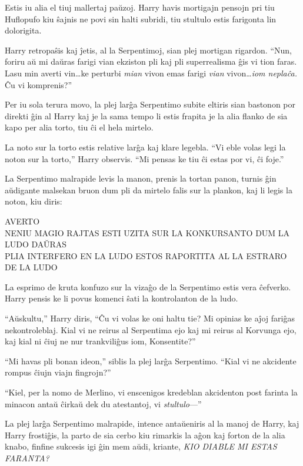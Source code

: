 Estis iu alia el tiuj mallertaj paŭzoj. Harry havis mortigajn pensojn pri tiu
Huflopufo kiu ŝajnis ne povi sin halti subridi, tiu stultulo estis farigonta lin
dolorigita.

Harry retropaŝis kaj ĵetis, al la Serpentimoj, sian plej mortigan rigardon. ``Nun,
foriru aŭ mi daŭras farigi vian ekziston pli kaj pli superrealisma ĝis vi tion
faras. Lasu min averti vin\ldots ke perturbi \emph{mian} vivon emas farigi
\emph{vian} vivon\ldots \emph{iom neplaĉa.} Ĉu vi komprenis?''

Per iu sola terura movo, la plej larĝa Serpentimo subite eltiris sian bastonon
por direkti ĝin al Harry kaj je la sama tempo li estis frapita je la alia flanko
de sia kapo per alia torto, tiu ĉi el hela mirtelo.

La noto sur la torto estis relative larĝa kaj klare legebla. ``Vi eble
volas legi la noton sur la torto,'' Harry observis. ``Mi pensas ke
tiu ĉi estas por vi, ĉi foje.'' 

La Serpentimo malrapide levis la manon, prenis la tortan panon, turnis ĝin
aŭdigante malsekan bruon dum pli da mirtelo falis sur la plankon, kaj li legis
la noton, kiu diris:

\begin{center}
  AVERTO\\

  NENIU MAGIO RAJTAS ESTI UZITA SUR LA KONKURSANTO DUM LA LUDO DAŬRAS\\
  PLIA INTERFERO EN LA LUDO ESTOS RAPORTITA AL LA ESTRARO DE LA LUDO
\end{center}

La esprimo de kruta konfuzo sur la vizaĝo de la Serpentimo estis vera
ĉefverko. Harry pensis ke li povus komenci ŝati la kontrolanton de la
ludo.

``Aŭskultu,'' Harry diris, ``Ĉu vi volas ke oni haltu tie? Mi opinias ke aĵoj
fariĝas nekontroleblaj. Kial vi ne reirus al Serpentima ejo kaj mi reirus al
Korvunga ejo, kaj kial ni ĉiuj ne nur trankviliĝus iom, Konsentite?''

``Mi havas pli bonan ideon,'' siblis la plej larĝa Serpentimo. ``Kial vi ne
akcidente rompus ĉiujn viajn fingrojn?''

``Kiel, per la nomo de Merlino, vi enscenigos kredeblan akcidenton post
farinta la minacon antaŭ ĉirkaŭ dek du atestantoj, vi \emph{stultulo}—''


La plej larĝa Serpentimo malrapide, intence antaŭeniris al la manoj de
Harry, kaj Harry frostiĝis, la parto de sia cerbo kiu rimarkis la aĝon
kaj forton de la alia knabo, finfine sukcesis igi ĝin mem aŭdi,
kriante, \emph{KIO DIABLE MI ESTAS FARANTA?}


